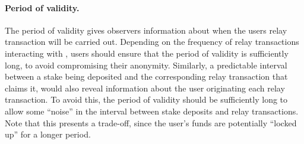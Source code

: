 \paragraph{Period of validity.} The period of validity gives observers information about when the users relay transaction will be carried out. Depending on the frequency of relay transactions interacting with \stakecontract{}, users should ensure that the period of validity is sufficiently long, to avoid compromising their anonymity. Similarly, a predictable interval between a stake being deposited and the corresponding relay transaction that claims it, would also reveal information about the user originating each relay transaction. To avoid this, the period of validity should be sufficiently long to allow some ``noise'' in the interval between stake deposits and relay transactions. Note that this presents a trade-off, since the user's funds are potentially ``locked up'' for a longer period.

